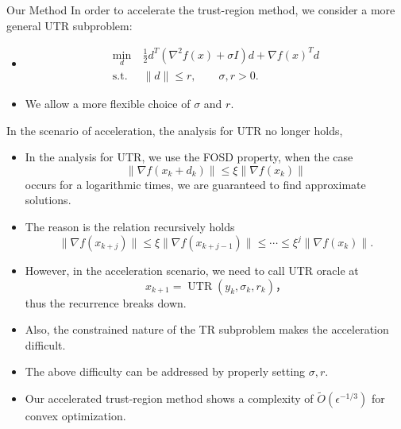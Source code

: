 \documentclass[10pt, notheorems, envcountsect]{beamer}
\theoremstyle{plain}
\begin{document}
\begin{frame}[allowframebreaks]{Our Method}
    In order to accelerate the trust-region method, we consider a more general UTR subproblem:
    \begin{itemize}
        \item \begin{equation}\label{eq.newTR general}
    \begin{split}
        \min_d ~&  \frac{1}{2}d^T\left (\nabla^2 f(x) + \sigma I \right ) d + \nabla f(x)^T d\\
        \text{s.t. } ~& \|d\| \le r, \qquad \sigma, r > 0.
    \end{split}
    \end{equation}
    \item We allow a more flexible choice of $\sigma$ and $r$.
    \end{itemize}
    \framebreak
    In the scenario of acceleration, the analysis for UTR no longer holds,
    \begin{itemize}
        \item In the analysis for UTR, we use the FOSD property, when the case
        \begin{equation*}
            \|\nabla f(x_k+d_k)\| \leq \xi \|\nabla f(x_k)\|
        \end{equation*}
        occurs for a logarithmic times, we are guaranteed to find approximate solutions.
        \item The reason is the relation recursively holds
        \begin{equation*}
            \|\nabla f(x_{k+j})\| \leq \xi \|\nabla f(x_{k+j-1})\| \leq \cdots\leq \xi^j \|\nabla f(x_k)\|.
        \end{equation*}
        \item However, in the acceleration scenario, we need to call UTR oracle at 
        \begin{equation*}
            x_{k+1} = \operatorname{UTR}(y_k,\sigma_k,r_k)，
        \end{equation*}
        thus the recurrence breaks down.
        \item Also, the constrained nature of the TR subproblem makes the acceleration difficult.
    \end{itemize}
    \framebreak
    \begin{itemize}
        \item The above difficulty can be addressed by properly setting $\sigma,r$.
        \item Our accelerated trust-region method shows a complexity of $\tilde O(\epsilon^{-1/3})$ for convex optimization.
    \end{itemize}
\end{frame}
\end{document}
